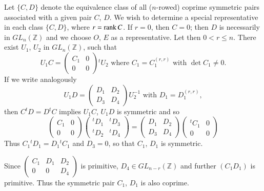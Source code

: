 Let $\{C,D\}$ denote the equivalence class of all ($n$-rowed) coprime
symmetric pairs associated with a given pair $C$, $D$. We wish to
determine a special representative in each class $\{C,D\}$, where
$r=\operatorname{rank} C$. If $r=0$, then $C=0$; then $D$ is necessarily in
$GL_{n}(\mathbb{Z})$ and we choose $O$, $E$ as a representative. Let
then $0<r\leq n$. There exist $U_{1}$, $U_{2}$ in
$GL_{n}(\mathbb{Z})$, such that
$$
U_{1}C=
\begin{pmatrix}
C_{1} & 0\\
0 & 0
\end{pmatrix}
{}^{t}U_{2}\text{ \  where \ } C_{1}=C^{(r,r)}_{1}\text{ \ with \ }
\det C_{1}\neq 0.
$$
If we write analogously
$$
U_{1}D=
\begin{pmatrix}
D_{1} & D_{2}\\
D_{3} & D_{4}
\end{pmatrix}
U^{-1}_{2}\text{ \ with \ }D_{1}=D_{1}^{(r,r)},
$$
then $C{}^{t}D=D{}^{t}C$ implies $U_{1}C$, $U_{1}D$ is symmetric and
so
$$
\begin{pmatrix}
C_{1} & 0\\
0 & 0
\end{pmatrix}
\begin{pmatrix}
{}^{t}D_{1} & {}^{t}D_{3}\\
{}^{t}D_{2} & {}^{t}D_{4}
\end{pmatrix}
=
\begin{pmatrix}
D_{1} & D_{2}\\
D_{3} & D_{4}
\end{pmatrix}
\begin{pmatrix}
{}^{t}C_{1} & 0\\
0 & 0
\end{pmatrix}
$$
Thus $C_{1}{}^{t}D_{1}=D_{1}{}^{t}C_{1}$ and $D_{3}=0$, so that
$C_{1}$, $D_{1}$ is symmetric.

Since $\left(\begin{smallmatrix} C_{1} & D_{1} & D_{2}\\ 0 & 0 & D_{4}
\end{smallmatrix}\right)$ is primitive, $D_{4}\in
GL_{n-r}(\mathbb{Z})$ and further $(C_{1}D_{1})$ is primitive. Thus
the symmetric pair $C_{1}$, $D_{1}$ is also coprime.

